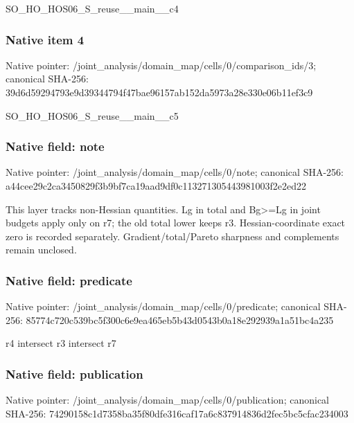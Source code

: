 \documentclass[10pt,a4paper]{article}
\begin{document}
\begingroup\raggedright\sloppy SO\_\allowbreak{}HO\_\allowbreak{}HOS06\_\allowbreak{}S\_\allowbreak{}reuse\_\allowbreak{}\_\allowbreak{}main\_\allowbreak{}\_\allowbreak{}c4\par\endgroup

\subsubsection{Native item 4}
Native pointer: /joint\_\allowbreak{}analysis/domain\_\allowbreak{}map/cells/0/comparison\_\allowbreak{}ids/3; canonical SHA-256: 39d6d59294793e9d39344794f47bae96157ab152da5973a28e330e06b11ef3c9

\begingroup\raggedright\sloppy SO\_\allowbreak{}HO\_\allowbreak{}HOS06\_\allowbreak{}S\_\allowbreak{}reuse\_\allowbreak{}\_\allowbreak{}main\_\allowbreak{}\_\allowbreak{}c5\par\endgroup

\subsubsection{Native field: note}
Native pointer: /joint\_\allowbreak{}analysis/domain\_\allowbreak{}map/cells/0/note; canonical SHA-256: a44cee29c2ca3450829f3b9bf7ca19aad9df0c113271305443981003f2e2ed22

\begingroup\raggedright\sloppy This layer tracks non-Hessian quantities. Lg in total and Bg>=\allowbreak{}Lg in joint budgets apply only on r7;\allowbreak{} the old total lower keeps r3. Hessian-coordinate exact zero is recorded separately. Gradient/\allowbreak{}total/\allowbreak{}Pareto sharpness and complements remain unclosed.\par\endgroup

\subsubsection{Native field: predicate}
Native pointer: /joint\_\allowbreak{}analysis/domain\_\allowbreak{}map/cells/0/predicate; canonical SHA-256: 85774c720c539bc5f300c6e9ea465eb5b43d0543b0a18e292939a1a51bc4a235

\begingroup\raggedright\sloppy r4 intersect r3 intersect r7\par\endgroup

\subsubsection{Native field: publication}
Native pointer: /joint\_\allowbreak{}analysis/domain\_\allowbreak{}map/cells/0/publication; canonical SHA-256: 74290158c1d7358ba35f80dfe316caf17a6c837914836d2fec5bc5cfac234003
\end{document}
